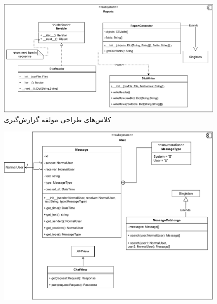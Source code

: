 \eject  \pdfpagewidth=10in \pdfpageheight=10in

\begin{figure}[ht!]
	\centering
	\includegraphics[scale=0.8]{figs/design-class/reports.pdf}
	\caption{کلاس‌های طراحی مولفه گزارش‌گیری}
\end{figure}
\FloatBarrier
\newpage

\recalctypearea

\begin{figure}[ht!]
	\centering
	\includegraphics[scale=0.8]{figs/design-class/chat.pdf}
\end{figure}
\FloatBarrier
\newpage

\eject \pdfpagewidth=18in \pdfpageheight=12in

